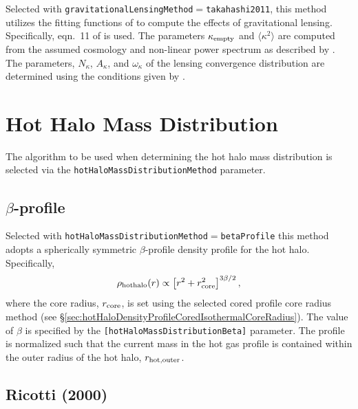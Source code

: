 Selected with {\tt gravitationalLensingMethod}$=${\tt takahashi2011}, this method utilizes the fitting functions of \cite{takahashi_probability_2011} to compute the effects of gravitational lensing. Specifically, eqn.~11 of \cite{takahashi_probability_2011} is used. The parameters $\kappa_{\rm empty}$ and $\langle \kappa^2 \rangle$ are computed from the assumed cosmology and non-linear power spectrum as described by \cite[][eqns.~5 and 2 respectively]{takahashi_probability_2011}. The parameters, $N_\kappa$, $A_\kappa$, and $\omega_\kappa$ of the lensing convergence distribution are determined using the conditions given by \cite[][eqn.~9]{takahashi_probability_2011}.

\section{Hot Halo Mass Distribution}

The algorithm to be used when determining the hot halo mass distribution is selected via the {\tt hotHaloMassDistributionMethod} parameter.

\subsection{$\beta$-profile}\label{phys:hotHaloMassDistribution:hotHaloMassDistributionBetaProfile}

Selected with {\tt hotHaloMassDistributionMethod}$=${\tt betaProfile} this method adopts a spherically symmetric $\beta$-profile density profile for the hot halo. Specifically,
\begin{equation}
 \rho_{\rm hot halo}(r) \propto \left[ r^2 + r_{\rm core}^2 \right]^{3\beta/2},
\end{equation}
where the core radius, $r_{\rm core}$, is set using the selected cored profile core radius method (see \S\ref{sec:hotHaloDensityProfileCoredIsothermalCoreRadius}). The value of $\beta$ is specified by the {\tt [hotHaloMassDistributionBeta]} parameter. The profile is normalized such that the current mass in the hot gas profile is contained within the outer radius of the hot halo, $r_{\rm hot, outer}$.

\subsection{Ricotti (2000)}\label{phys:hotHaloMassDistribution:hotHaloMassDistributionRicotti2000}

